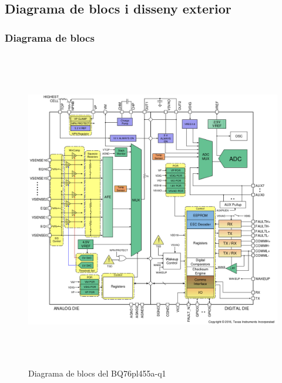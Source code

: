 \subsection{Diagrama de blocs i disseny exterior}

\subsubsection{Diagrama de blocs}
\begin{figure}[H]
	\centering
    \includegraphics[width=\textwidth, height=14cm] {Prototip/diagramablocs.png}
    \caption{Diagrama de blocs del BQ76pl455a-q1}
\end{figure}

